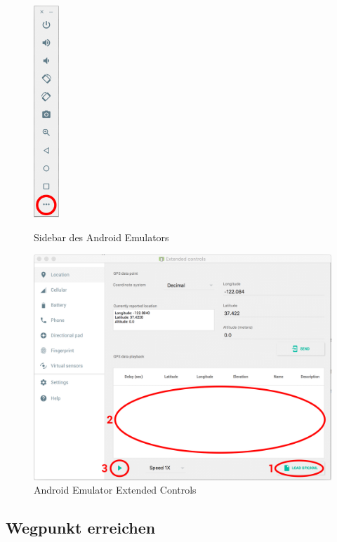 \documentclass[a4paper,10pt,xetex]{article}
\begin{document}
\begin{figure}
  \centering
  \begin{minipage}[b]{0.28\textwidth}
    \includegraphics[height=8cm]{screenshots/EmulatorSidebar}
    \caption{Sidebar des Android Emulators}
    \label{fig:android-emulator-sidebar}
  \end{minipage}
  \hfill
  \begin{minipage}[b]{0.68\textwidth}
    \includegraphics[width=\textwidth]{screenshots/EmulatorExtendedControls}
    \caption{Android Emulator Extended Controls}
    \label{fig:android-emulator-extended-controls}
  \end{minipage}
\end{figure}

\newpage
\subsection{Wegpunkt erreichen}
\end{document}
